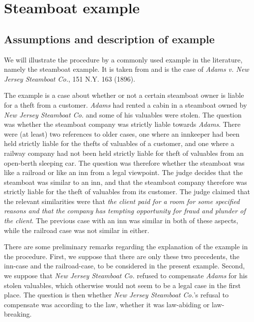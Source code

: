 \section{Steamboat example}\label{SteamboatExampleCTT}
	
		\subsection{Assumptions and description of example}
	
			We will illustrate the procedure by a commonly used example in the literature, namely the steamboat example. It is taken from \textcite[pp. 1003-1005]{Brewer1996} and is the case of \textsf{\textit{Adams v. New Jersey Steamboat Co.}, 151 N.Y. 163 (1896)}. 
		
			The example is a case about whether or not a certain steamboat owner is liable for a theft from a customer. \textit{Adams} had rented a cabin in a steamboat owned by \textit{New Jersey Steamboat Co.} and some of his valuables were stolen. The question was whether the steamboat company was strictly liable towards \textit{Adams}. There were (at least) two references to older cases, one where an innkeeper had been held strictly liable for the thefts of valuables of a customer, and one where a railway company had not been held strictly liable for theft of valuables from an open-berth sleeping car. The question was therefore whether the steamboat was like a railroad or like an inn from a legal viewpoint. The judge decides that the steamboat was similar to an inn, and that the steamboat company therefore was strictly liable for the theft of valuables from its customer. The judge claimed that the relevant similarities were that \textit{the client paid for a room for some specified reasons and that the company has tempting opportunity for fraud and plunder of the client}. The previous case with an inn was similar in both of these aspects, while the railroad case was not similar in either. \autocite[,1003-1005, 1013-1015]{Brewer1996}
			
			There are some preliminary remarks regarding the explanation of the example in the procedure. First, we suppose that there are only these two precedents, the inn-case and the railroad-case, to be considered in the present example. Second, we suppose that \textit{New Jersey Steamboat Co.} refused to compensate \textit{Adams} for his stolen valuables, which otherwise would not seem to be a legal case in the first place. The question is then whether \textit{New Jersey Steamboat Co.}'s refusal to compensate was according to the law, whether it was law-abiding or law-breaking. 
			
